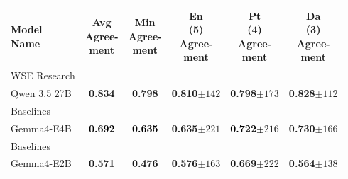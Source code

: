 \begin{tabularx}{\textwidth}{X | c c c c c}
\hline
\makecell[b]{\textbf{Model} \\ \textbf{Name}} & \makecell[b]{\textbf{Avg} \\ \textbf{Agree-} \\ \textbf{ment}} & \makecell[b]{\textbf{Min} \\ \textbf{Agree-} \\ \textbf{ment}} & \makecell[b]{\textbf{En} \\ \textbf{(5)} \\ \textbf{Agree-} \\ \textbf{ment}} & \makecell[b]{\textbf{Pt} \\ \textbf{(4)} \\ \textbf{Agree-} \\ \textbf{ment}} & \makecell[b]{\textbf{Da} \\ \textbf{(3)} \\ \textbf{Agree-} \\ \textbf{ment}} \\
\hline
WSE Research\\\subcatarrow{}Qwen 3.5 27B & \textbf{\textcolor{BrickRed}{0.834}} & \textbf{\textcolor{BrickRed}{0.798}} & \textbf{\textcolor{BrickRed}{0.810$\pm{}142$}} & \textbf{\textcolor{BrickRed}{0.798$\pm{}173$}} & \textbf{\textcolor{BrickRed}{0.828$\pm{}112$}} \\
Baselines\\\subcatarrow{}Gemma4-E4B & \textbf{\textcolor{Black}{0.692}} & \textbf{\textcolor{Black}{0.635}} & \textbf{\textcolor{White!50!NavyBlue}{0.635$\pm{}221$}} & \textbf{\textcolor{Black}{0.722$\pm{}216$}} & \textbf{\textcolor{White!50!BrickRed}{0.730$\pm{}166$}} \\
Baselines\\\subcatarrow{}Gemma4-E2B & \textbf{\textcolor{NavyBlue}{0.571}} & \textbf{\textcolor{NavyBlue}{0.476}} & \textbf{\textcolor{NavyBlue}{0.576$\pm{}163$}} & \textbf{\textcolor{NavyBlue}{0.669$\pm{}222$}} & \textbf{\textcolor{NavyBlue}{0.564$\pm{}138$}} \\
\hline
\end{tabularx}